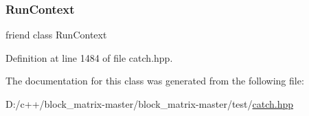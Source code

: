 \subsubsection{\texorpdfstring{Run\+Context}{RunContext}}
{\footnotesize\ttfamily friend class Run\+Context\hspace{0.3cm}{\ttfamily [friend]}}



Definition at line 1484 of file catch.\+hpp.



The documentation for this class was generated from the following file\+:\begin{DoxyCompactItemize}
\item 
D\+:/c++/block\+\_\+matrix-\/master/block\+\_\+matrix-\/master/test/\mbox{\hyperlink{catch_8hpp}{catch.\+hpp}}\end{DoxyCompactItemize}
